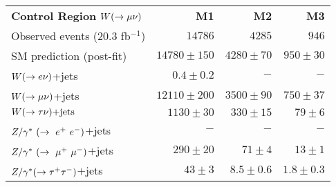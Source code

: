 \begin{table}[!ht]
\begin{center}
\begin{small}
\begin{tabular*}{\textwidth}{@{\extracolsep{\fill}}lrrr}\hline
{\bf Control Region} $W(\rightarrow \mu \nu)$  & \textbf{M1} & \textbf{M2} & \textbf{M3}  \\
    Observed events  (20.3 fb${}^{-1}$)&  $14786$                   & $4285$        & $946$            \\ \hline
                                                                                                     
    SM prediction (post-fit)                     &  $14780 \pm 150$           & $4280 \pm 70$ & $950 \pm 30$     \\ \hline
                                                                                                     
    $W(\rightarrow e \nu)$+jets                             &  $0.4 \pm 0.2$             & $-$           & $-$              \\
                                                                                                     
    $W(\rightarrow \mu \nu)$+jets                             &  $12110 \pm 200$           & $3500 \pm 90$ & $750 \pm 37$      \\
                                                                                                     
    $W(\rightarrow \tau \nu)\text{+jets}$                             &  $1130 \pm 30$             & $330 \pm 15$  & $79 \pm 6$       \\
                                                                                                     
    $Z/\gamma^*~(\rightarrow~e^+~e^-)$+jets                             &  $-$                      & $-$           & $-$              \\
                                                                                                     
    $Z/\gamma^*~(\rightarrow~\mu^+~\mu^-)$+jets                             &  $290 \pm 20$              & $71 \pm 4$    & $13 \pm 1$     \\
                                                                                                     
    $Z/\gamma^*(\rightarrow \tau^+ \tau^-)$+jets                             &  $43 \pm 3$                & $8.5 \pm 0.6$ & $1.8 \pm 0.3$  \\
                                                                                                     

\end{tabular*}
\end{small}
\end{center}
\end{table}
